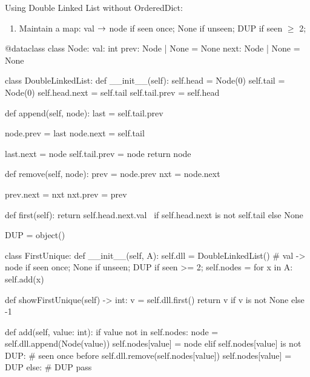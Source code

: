 Using Double Linked List without OrderedDict:
\begin{enumerate}
\item Maintain a map: val $\rightarrow$ node if seen once; None if unseen; DUP if seen $\ge$ 2;
\end{enumerate}
\begin{python}
@dataclass
class Node:
  val: int
  prev: Node | None = None
  next: Node | None = None

class DoubleLinkedList:
  def __init__(self):
    self.head = Node(0) 
    self.tail = Node(0)
    self.head.next = self.tail
    self.tail.prev = self.head

  def append(self, node):
    last = self.tail.prev

    node.prev = last
    node.next = self.tail

    last.next = node
    self.tail.prev = node
    return node

  def remove(self, node):
    prev = node.prev
    nxt =  node.next

    prev.next = nxt
    nxt.prev = prev

  def first(self):
    return self.head.next.val \
      if self.head.next is not self.tail else None

DUP = object()

class FirstUnique:
  def __init__(self, A):
    self.dll = DoubleLinkedList()
    # val -> node if seen once; None if unseen; DUP if seen >= 2;
    self.nodes = {}
    for x in A:
      self.add(x)

  def showFirstUnique(self) -> int:
    v = self.dll.first()
    return v if v is not None else -1

  def add(self, value: int):
    if value not in self.nodes:
      node = self.dll.append(Node(value))
      self.nodes[value] = node
    elif self.nodes[value] is not DUP:
      # seen once before
      self.dll.remove(self.nodes[value])
      self.nodes[value] = DUP
    else:
      # DUP 
      pass 
\end{python}
